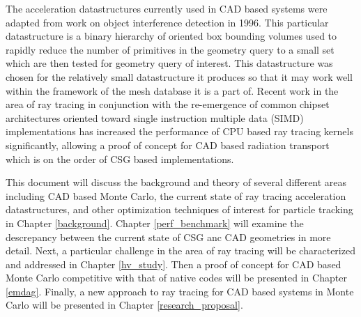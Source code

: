 \documentclass[12pt, a4paper]{article}
\begin{document}
The acceleration datastructures currently used in CAD based systems were adapted from work on object interference detection\cite{gottschalk1996obbtree} in 1996. This particular datastructure is a binary hierarchy of oriented box bounding volumes used to rapidly reduce the number of primitives in the geometry query to a small set which are then tested for geometry query of interest. This datastructure was chosen for the relatively small datastructure it produces so that it may work well within the framework of the mesh database it is a part of. Recent work in the area of ray tracing in conjunction with the re-emergence of common chipset architectures oriented toward single instruction multiple data (SIMD) implementations has increased the performance of CPU based ray tracing kernels significantly, allowing a proof of concept for CAD based radiation transport which is on the order of CSG based implementations.

This document will discuss the background and theory of several different areas including CAD based Monte Carlo, the current state of ray tracing acceleration datastructures, and other optimization techniques of interest for particle tracking in Chapter \ref{background}. Chapter \ref{perf_benchmark} will examine the descrepancy between the current state of CSG anc CAD geometries in more detail. Next, a particular challenge in the area of ray tracing will be characterized and addressed in Chapter \ref{hv_study}. Then a proof of concept for CAD based Monte Carlo competitive with that of native codes will be presented in Chapter \ref{emdag}. Finally, a new approach to ray tracing for CAD based systems in Monte Carlo will be presented in Chapter \ref{research_proposal}.



\end{document}
